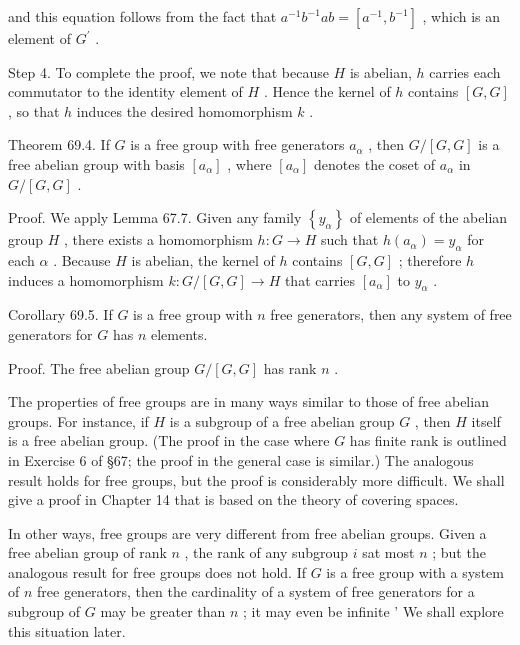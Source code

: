 and this equation follows from the fact that \({a}^{-1}{b}^{-1}{ab} = \left\lbrack  {{a}^{-1},{b}^{-1}}\right\rbrack\) , which is an element of \({G}^{\prime }\) .

Step 4. To complete the proof, we note that because \(H\) is abelian, \(h\) carries each commutator to the identity element of \(H\) . Hence the kernel of \(h\) contains \(\left\lbrack  {G,G}\right\rbrack\) , so that \(h\) induces the desired homomorphism \(k\) .

Theorem 69.4. If \(G\) is a free group with free generators \({a}_{\alpha }\) , then \(G/\left\lbrack  {G,G}\right\rbrack\) is a free abelian group with basis \(\left\lbrack  {a}_{\alpha }\right\rbrack\) , where \(\left\lbrack  {a}_{\alpha }\right\rbrack\) denotes the coset of \({a}_{\alpha }\) in \(G/\left\lbrack  {G,G}\right\rbrack\) .

Proof. We apply Lemma 67.7. Given any family \(\left\{  {y}_{\alpha }\right\}\) of elements of the abelian group \(H\) , there exists a homomorphism \(h : G \rightarrow  H\) such that \(h\left( {a}_{\alpha }\right)  = {y}_{\alpha }\) for each \(\alpha\) . Because \(H\) is abelian, the kernel of \(h\) contains \(\left\lbrack  {G,G}\right\rbrack\) ; therefore \(h\) induces a homomorphism \(k : G/\left\lbrack  {G,G}\right\rbrack   \rightarrow  H\) that carries \(\left\lbrack  {a}_{\alpha }\right\rbrack\) to \({y}_{\alpha }\) .

Corollary 69.5. If \(G\) is a free group with \(n\) free generators, then any system of free generators for \(G\) has \(n\) elements.

Proof. The free abelian group \(G/\left\lbrack  {G,G}\right\rbrack\) has rank \(n\) .

The properties of free groups are in many ways similar to those of free abelian groups. For instance, if \(H\) is a subgroup of a free abelian group \(G\) , then \(H\) itself is a free abelian group. (The proof in the case where \(G\) has finite rank is outlined in Exercise 6 of  \S 67; the proof in the general case is similar.) The analogous result holds for free groups, but the proof is considerably more difficult. We shall give a proof in Chapter 14 that is based on the theory of covering spaces.

In other ways, free groups are very different from free abelian groups. Given a free abelian group of rank \(n\) , the rank of any subgroup \(i\) sat most \(n\) ; but the analogous result for free groups does not hold. If \(G\) is a free group with a system of \(n\) free generators, then the cardinality of a system of free generators for a subgroup of \(G\) may be greater than \(n\) ; it may even be infinite ’ We shall explore this situation later.

